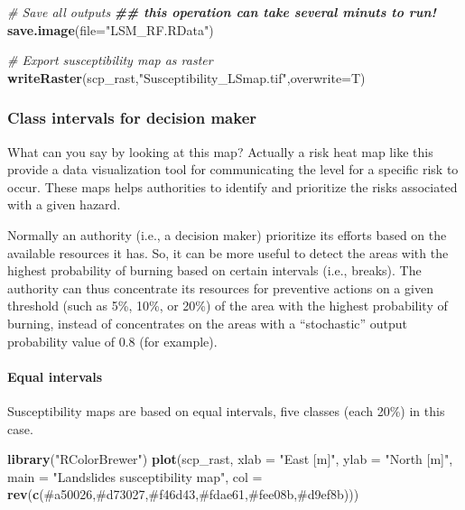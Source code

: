 \documentclass[
]{article}
\newenvironment{Shaded}{\begin{snugshade}}{\end{snugshade}}
\newcommand{\AttributeTok}[1]{\textcolor[rgb]{0.13,0.29,0.53}{#1}}
\newcommand{\CommentTok}[1]{\textcolor[rgb]{0.56,0.35,0.01}{\textit{#1}}}
\newcommand{\DocumentationTok}[1]{\textcolor[rgb]{0.56,0.35,0.01}{\textbf{\textit{#1}}}}
\newcommand{\FunctionTok}[1]{\textcolor[rgb]{0.13,0.29,0.53}{\textbf{#1}}}
\newcommand{\NormalTok}[1]{#1}
\newcommand{\StringTok}[1]{\textcolor[rgb]{0.31,0.60,0.02}{#1}}
\begin{document}
\begin{Shaded}
\begin{Highlighting}[]
\CommentTok{\# Save all outputs}
\DocumentationTok{\#\# this operation can take several minuts to run!}
\FunctionTok{save.image}\NormalTok{(}\AttributeTok{file=}\StringTok{"LSM\_RF.RData"}\NormalTok{)}

\CommentTok{\# Export susceptibility map as raster}
\FunctionTok{writeRaster}\NormalTok{(scp\_rast,}\StringTok{"Susceptibility\_LSmap.tif"}\NormalTok{,}\AttributeTok{overwrite=}\NormalTok{T) }
\end{Highlighting}
\end{Shaded}

\subsubsection{Class intervals for decision maker}\label{class-intervals-for-decision-maker}

What can you say by looking at this map?
Actually a risk heat map like this provide a data visualization tool for communicating the level for a specific risk to occur.
These maps helps authorities to identify and prioritize the risks associated with a given hazard.

Normally an authority (i.e., a decision maker) prioritize its efforts based on the available resources it has.
So, it can be more useful to detect the areas with the highest probability of burning based on certain intervals (i.e., breaks).
The authority can thus concentrate its resources for preventive actions on a given threshold (such as 5\%, 10\%, or 20\%) of the area with the highest probability of burning, instead of concentrates on the areas with a ``stochastic'' output probability value of 0.8 (for example).

\paragraph{Equal intervals}\label{equal-intervals}

Susceptibility maps are based on equal intervals, five classes (each 20\%) in this case.

\begin{Shaded}
\begin{Highlighting}[]
\FunctionTok{library}\NormalTok{(}\StringTok{"RColorBrewer"}\NormalTok{)}
\FunctionTok{plot}\NormalTok{(scp\_rast, }\AttributeTok{xlab =} \StringTok{"East [m]"}\NormalTok{, }\AttributeTok{ylab =} \StringTok{"North [m]"}\NormalTok{, }\AttributeTok{main =} \StringTok{"Landslides susceptibility map"}\NormalTok{, }\AttributeTok{col =} \FunctionTok{rev}\NormalTok{(}\FunctionTok{c}\NormalTok{(}\StringTok{\textquotesingle{}\#a50026\textquotesingle{}}\NormalTok{,}\StringTok{\textquotesingle{}\#d73027\textquotesingle{}}\NormalTok{,}\StringTok{\textquotesingle{}\#f46d43\textquotesingle{}}\NormalTok{,}\StringTok{\textquotesingle{}\#fdae61\textquotesingle{}}\NormalTok{,}\StringTok{\textquotesingle{}\#fee08b\textquotesingle{}}\NormalTok{,}\StringTok{\textquotesingle{}\#d9ef8b\textquotesingle{}}\NormalTok{)))}
\end{Highlighting}
\end{Shaded}
\end{document}
